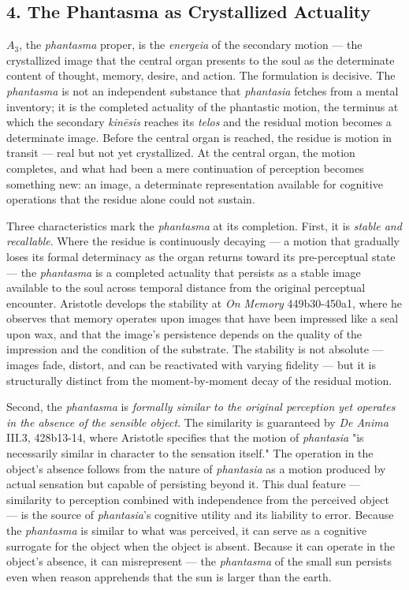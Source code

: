 \documentclass[12pt]{article}
\begin{document}
\subsection*{4. The Phantasma as Crystallized Actuality}

$A_3$, the \textit{phantasma} proper, is the \textit{energeia} of the secondary motion --- the crystallized image that the central organ presents to the soul as the determinate content of thought, memory, desire, and action. The formulation is decisive. The \textit{phantasma} is not an independent substance that \textit{phantasia} fetches from a mental inventory; it is the completed actuality of the phantastic motion, the terminus at which the secondary \textit{kinēsis} reaches its \textit{telos} and the residual motion becomes a determinate image. Before the central organ is reached, the residue is motion in transit --- real but not yet crystallized. At the central organ, the motion completes, and what had been a mere continuation of perception becomes something new: an image, a determinate representation available for cognitive operations that the residue alone could not sustain.

Three characteristics mark the \textit{phantasma} at its completion. First, it is \textit{stable and recallable}. Where the residue is continuously decaying --- a motion that gradually loses its formal determinacy as the organ returns toward its pre-perceptual state --- the \textit{phantasma} is a completed actuality that persists as a stable image available to the soul across temporal distance from the original perceptual encounter. Aristotle develops the stability at \textit{On Memory} 449b30-450a1, where he observes that memory operates upon images that have been impressed like a seal upon wax, and that the image's persistence depends on the quality of the impression and the condition of the substrate. The stability is not absolute --- images fade, distort, and can be reactivated with varying fidelity --- but it is structurally distinct from the moment-by-moment decay of the residual motion.

Second, the \textit{phantasma} is \textit{formally similar to the original perception yet operates in the absence of the sensible object}. The similarity is guaranteed by \textit{De Anima} III.3, 428b13-14, where Aristotle specifies that the motion of \textit{phantasia} "is necessarily similar in character to the sensation itself." The operation in the object's absence follows from the nature of \textit{phantasia} as a motion produced by actual sensation but capable of persisting beyond it. This dual feature --- similarity to perception combined with independence from the perceived object --- is the source of \textit{phantasia}'s cognitive utility and its liability to error. Because the \textit{phantasma} is similar to what was perceived, it can serve as a cognitive surrogate for the object when the object is absent. Because it can operate in the object's absence, it can misrepresent --- the \textit{phantasma} of the small sun persists even when reason apprehends that the sun is larger than the earth.
\end{document}
